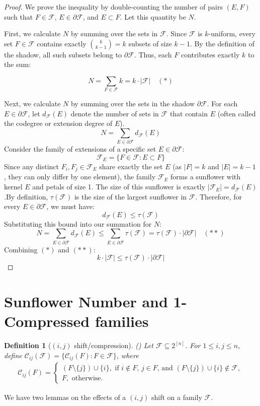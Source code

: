 \documentclass[runningheads,12pt,a4paper]{article}
\newtheorem{definition}{Definition}
\begin{document}
	\begin{proof}
		We prove the inequality by double-counting the number of pairs $(E, F)$ such that $F \in \mathcal{F}$, $E \in \partial \mathcal{F}$, and $E \subset F$. Let this quantity be $N$.
		
		First, we calculate $N$ by summing over the sets in $\mathcal{F}$. Since $\mathcal{F}$ is $k$-uniform, every set $F \in \mathcal{F}$ contains exactly $\binom{k}{k-1} = k$ subsets of size $k-1$. By the definition of the shadow, all such subsets belong to $\partial \mathcal{F}$. Thus, each $F$ contributes exactly $k$ to the sum:
		
		$$N = \sum_{F \in \mathcal{F}} k = k \cdot |\mathcal{F}| \quad (*)$$
		
		Next, we calculate $N$ by summing over the sets in the shadow $\partial \mathcal{F}$. For each $E \in \partial \mathcal{F}$, let $d_{\mathcal{F}}(E)$ denote the number of sets in $\mathcal{F}$ that contain $E$ (often called the codegree or extension degree of $E$).$$N = \sum_{E \in \partial \mathcal{F}} d_{\mathcal{F}}(E)$$Consider the family of extensions of a specific set $E \in \partial \mathcal{F}$:$$\mathcal{F}_E = \{F \in \mathcal{F} : E \subset F\}$$Since any distinct $F_i, F_j \in \mathcal{F}_E$ share exactly the set $E$ (as $|F| = k$ and $|E| = k-1$, they can only differ by one element), the family $\mathcal{F}_E$ forms a sunflower with kernel $E$ and petals of size 1. The size of this sunflower is exactly $|\mathcal{F}_E| = d_{\mathcal{F}}(E)$.By definition, $\tau(\mathcal{F})$ is the size of the largest sunflower in $\mathcal{F}$. Therefore, for every $E \in \partial \mathcal{F}$, we must have:$$d_{\mathcal{F}}(E) \leq \tau(\mathcal{F})$$Substituting this bound into our summation for $N$:$$N = \sum_{E \in \partial \mathcal{F}} d_{\mathcal{F}}(E) \leq \sum_{E \in \partial \mathcal{F}} \tau(\mathcal{F}) = \tau(\mathcal{F}) \cdot |\partial \mathcal{F}| \quad (**)$$Combining $(*)$ and $(**)$:$$k \cdot |\mathcal{F}| \leq \tau(\mathcal{F}) \cdot |\partial \mathcal{F}|$$
	\end{proof}
	
	\section{Sunflower Number and 1-Compressed families }
	\label{sec:shift}
	\begin{definition}[$(i,j)$ shift/compression](\cite{frankl1987})
		Let $\mathcal{F} \subseteq 2^{[n]}$. For $1 \leq i,j \leq n$, define $\mathcal{C}_{ij}(\mathcal{F})= \{\mathcal{C}_{ij}(F): F \in \mathcal{F}\}$, where
		\begin{align*}
			\mathcal{C}_{ij}(F) = \begin{cases}
				(F \setminus \{j\})\cup \{i\} , \text{ if  $i \not \in F$, $j \in F$, and $(F \setminus \{j\})\cup \{i\} \not\in \mathcal{F}$},\\
				F, \text{ otherwise.}
			\end{cases}
		\end{align*}
	\end{definition}
	We have two lemmas on the effects of a $(i,j)$ shift on a family $\mathcal{F}$.
	
\end{document}
